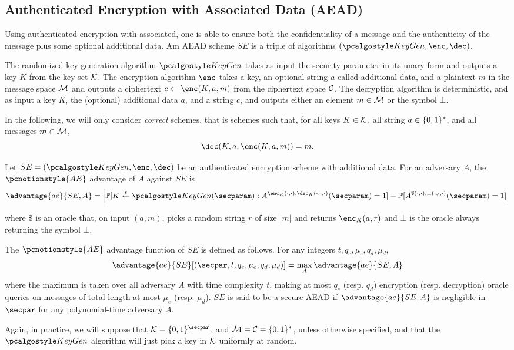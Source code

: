 
\subsection{Authenticated Encryption with Associated Data (AEAD)} %
\label{sub:def_aead}

Using authenticated encryption with associated, one is able to ensure both the confidentiality of a message and the authenticity of the message plus some optional additional data.
Am AEAD scheme $SE$ is a triple of algorithms $(\KeyGen, \Enc, \Dec)$.

The randomized key generation algorithm $\KeyGen$ takes as input the security parameter in its unary form and outputs a key $K$ from the key set $\mathcal{K}$.
The encryption algorithm $\Enc$ takes a key, an optional string $a$ called additional data, and a plaintext $m$ in the message space $\mathcal{M}$ and outputs a ciphertext $c \gets \Enc(K,a,m)$ from the ciphertext space $\mathcal{C}$.
The decryption algorithm is deterministic, and as input a key $K$, the (optional) additional data $a$, and a string $c$, and outputs either an element $m \in \mathcal{M}$ or the symbol $\bot$.

In the following, we will only consider \emph{correct} schemes, that is schemes such that, for all keys $K \in \mathcal{K}$, all string $a \in \{0,1\}^*$, and all messages $m \in \mathcal{M}$, 
\[
	\Dec(K,a,\Enc(K,a,m)) = m.
\]


\begin{definition}
	\label{def:aead_sec}
	Let $SE = (\KeyGen, \Enc, \Dec)$ be an authenticated encryption scheme with additional data.
	For an adversary $A$, the $\pcnotionstyle{AE}$ advantage of $A$ against $SE$ is
	\[
		\advantage{ae}{SE, A} = 
			\left|
			\Prob[K \getsr \KeyGen(\secparam) :  A^{\Enc_K(\cdot,\cdot), \Dec_K(\cdot,\cdot,\cdot)}(\secparam) = 1]
			- \Prob[  A^{\$(\cdot,\cdot), \bot(\cdot,\cdot,\cdot)}(\secparam) = 1 ] \right|
	\]
	
	where $\$$ is an oracle that, on input $(a,m)$, picks a random string $r$ of size $|m|$ and returns $\Enc_K(a,r)$ and $\bot$ is the oracle always returning the symbol $\bot$.

	The $\pcnotionstyle{AE}$ advantage function of $SE$ is defined as follows. For any integers $t,q_e, \mu_e, q_d, \mu_d$,
	\[
		\advantage{ae}{SE}[(\secpar, t, q_e, \mu_e, q_d, \mu_d)] = \max_{A} \advantage{ae}{SE, A}
	\]
	where the maximum is taken over all adversary $A$ with time complexity $t$, making at most $q_e$ (resp. $q_d$) encryption (resp. decryption) oracle queries on messages of total length at most $\mu_e$ (resp. $\mu_d$).
	$SE$ is said to be a secure AEAD if $\advantage{ae}{SE, A}$ is negligible in $\secpar$ for any polynomial-time adversary $A$.
\end{definition}

Again, in practice, we will suppose that $\cK = \zo^{\secpar}$, and $\mathcal{M} = \mathcal{C} = \{0,1\}^*$, unless otherwise specified, and that the $\KeyGen$ algorithm will just pick a key in $\mathcal{K}$ uniformly at random.



